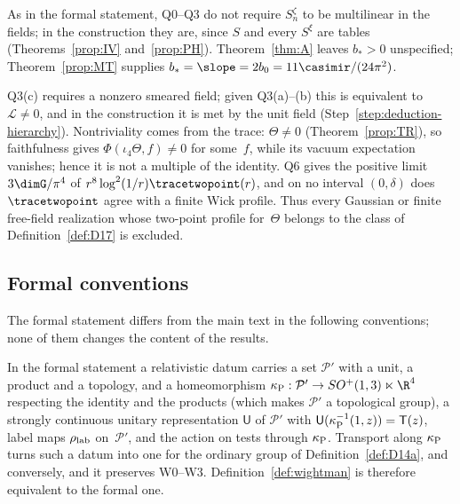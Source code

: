 As in the formal statement, Q0--Q3 do not require $S_n^\zeta$ to be multilinear in the fields; in the construction they are, since $S$ and every $S^\xi$ are tables (Theorems~\ref{prop:IV} and~\ref{prop:PH}). Theorem~\ref{thm:A} leaves $b_*>0$ unspecified; Theorem~\ref{prop:MT} supplies $b_*=\slope=2b_0=11\casimir/(24\pi^2)$.

\begin{remark}[Nontriviality]\label{rem:nontriviality}
Q3(c) requires a nonzero smeared field; given Q3(a)--(b) this is equivalent to $\mathcal L\ne0$, and in the construction it is met by the unit field (Step~\ref{step:deduction-hierarchy}). Nontriviality comes from the trace: $\Theta\ne0$ (Theorem~\ref{prop:TR}), so faithfulness gives $\Phi(\iota_4\Theta,f)\ne0$ for some~$f$, while its vacuum expectation vanishes; hence it is not a multiple of the identity. Q6 gives the positive limit $3\dimG/\pi^4$ of $r^8\log^2(1/r)\tracetwopoint(r)$, and on no interval $(0,\delta)$ does $\tracetwopoint$ agree with a finite Wick profile. Thus every Gaussian or finite free-field realization whose two-point profile for~$\Theta$ belongs to the class of Definition~\ref{def:D17} is excluded.
\end{remark}

\subsection{Formal conventions}\label{sec:formal-conventions}

The formal statement differs from the main text in the following conventions; none of them changes the content of the results.

\begin{remark}\label{rem:formal-poincare}
In the formal statement a relativistic datum carries a set $\mathcal P'$ with a unit, a product and a topology, and a homeomorphism $\kappa_{\rm P}:\mathcal P'\to SO^+(1,3)\ltimes\R^4$ respecting the identity and the products (which makes $\mathcal P'$ a topological group), a strongly continuous unitary representation $\mathsf U$ of $\mathcal P'$ with $\mathsf U(\kappa_{\rm P}^{-1}(1,z))=\mathsf T(z)$, label maps $\rho_{\rm lab}$ on~$\mathcal P'$, and the action on tests through $\kappa_{\rm P}$. Transport along $\kappa_{\rm P}$ turns such a datum into one for the ordinary group of Definition~\ref{def:D14a}, and conversely, and it preserves W0--W3. Definition~\ref{def:wightman} is therefore equivalent to the formal one.
\end{remark}

